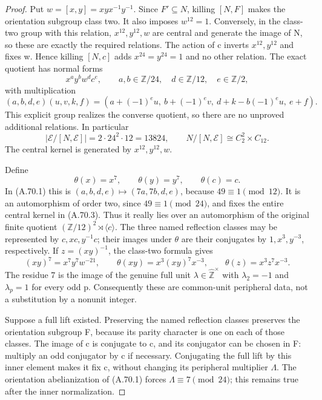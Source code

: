 \begin{proof}
Put \(w=[x,y]=xyx^{-1}y^{-1}\). Since \(F'\subseteq N\),
killing \([N,F]\) makes the orientation subgroup class two.
It also imposes \(w^{12}=1\). Conversely, in the class-two group
with this relation, \(x^{12},y^{12},w\) are central and generate
the image of N, so these are exactly the required relations.
The action of c inverts \(x^{12},y^{12}\) and fixes w. Hence
killing \([N,c]\) adds \(x^{24}=y^{24}=1\) and no other
relation. The exact quotient has normal forms
\[
 x^a y^b w^d c^e,
 \qquad a,b\in\mathbb Z/24,\quad d\in\mathbb Z/12,\quad
 e\in\mathbb Z/2,
 \tag{A.70.1}
\]
with multiplication
\[
 (a,b,d,e)(u,v,k,f)=
 (a+(-1)^e u,\ b+(-1)^e v,\ d+k-b(-1)^e u,\ e+f).
 \tag{A.70.2}
\]
This explicit group realizes the converse quotient, so there are
no unproved additional relations. In particular
\[
 |\mathcal E/[N,\mathcal E]|=2\cdot24^2\cdot12=13824,
 \qquad N/[N,\mathcal E]\cong C_2^2\times C_{12}.
 \tag{A.70.3}
\]
The central kernel is generated by \(x^{12},y^{12},w\).

Define
\[
 \theta(x)=x^7,\qquad\theta(y)=y^7,\qquad\theta(c)=c.
 \tag{A.70.4}
\]
In (A.70.1) this is \((a,b,d,e)\mapsto(7a,7b,d,e)\),
because \(49\equiv1\pmod {12}\). It is an automorphism of
order two, since \(49\equiv1\pmod {24}\), and fixes the
entire central kernel in (A.70.3). Thus it really lies over an
automorphism of the original finite quotient
\((\mathbb Z/12)^2\rtimes\langle c\rangle\).
The three named reflection classes may be represented by
\(c,xc,y^{-1}c\); their images under \(\theta\) are their conjugates
by \(1,x^3,y^{-3}\), respectively. If \(z=(xy)^{-1}\),
the class-two formula gives
\[
 (xy)^7=x^7y^7w^{-21},\qquad
 \theta(xy)=x^3(xy)^7x^{-3},\qquad
 \theta(z)=x^3z^7x^{-3}.
 \tag{A.70.5}
\]
The residue 7 is the image of the genuine full unit
\(\lambda\in\widehat{\mathbb Z}^{\times}\) with
\(\lambda_2=-1\) and \(\lambda_p=1\) for every odd p.
Consequently these are common-unit peripheral data, not a
substitution by a nonunit integer.

Suppose a full lift existed. Preserving the named reflection
classes preserves the orientation subgroup F, because its parity
character is one on each of those classes. The image of c is
conjugate to c, and its conjugator can be chosen in F: multiply
an odd conjugator by c if necessary. Conjugating the full lift
by this inner element makes it fix c, without changing its
peripheral multiplier \(\Lambda\). The orientation
abelianization of (A.70.1) forces
\(\Lambda\equiv7\pmod {24}\); this remains true after the
inner normalization.


\end{proof}
